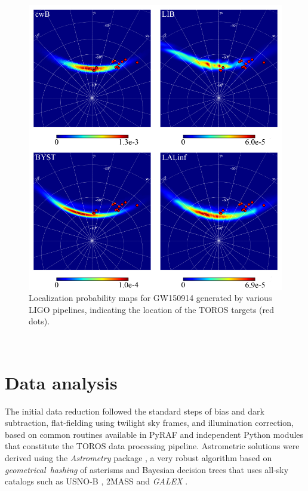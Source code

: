 \documentclass[apjl]{emulateapj}
\begin{document}
\begin{figure}[t]
\centering

\includegraphics[scale=0.80]{fig1.pdf}

\caption{Localization probability maps for GW150914 generated by various LIGO pipelines, indicating the location of the TOROS targets (red dots). \label{figmap}}
\end{figure}

\ \par 

\section{Data analysis}\label{data-analysis}
The initial data reduction followed the standard steps of bias and dark subtraction, flat-fielding using twilight sky frames, and illumination correction, based on common routines available in PyRAF and independent Python modules that constitute the TOROS data processing pipeline.  Astrometric solutions were derived using the {\it Astrometry} package \citep{Lang2009}, a very robust algorithm based on {\it geometrical~hashing} of asterisms and Bayesian decision trees that uses all-sky catalogs such as USNO-B \citep{Monet2003}, 2MASS \citep{Skrutskie2006} and {\it GALEX} \citep{Martin2003}.
\end{document}

